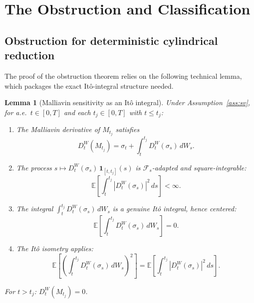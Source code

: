 \documentclass[11pt,a4paper]{article}
\theoremstyle{plain}
\newtheorem{lemma}[theorem]{Lemma}
\theoremstyle{definition}
\theoremstyle{remark}
\newcommand{\E}{\mathbb{E}}
\begin{document}
\section{The Obstruction and Classification}\label{sec:obstr}


\subsection{Obstruction for deterministic cylindrical reduction}

The proof of the obstruction theorem relies on the following technical lemma, which packages the exact Itô-integral structure needed.

\begin{lemma}[Malliavin sensitivity as an It\^o integral]\label{lem:mall_ito}
Under Assumption~\ref{ass:sv}, for a.e.\ $t \in [0,T]$ and each $t_j \in [0,T]$ with $t \le t_j$:
\begin{enumerate}[label=\textup{(\alph*)}]
\item The Malliavin derivative of $M_{t_j}$ satisfies
\begin{equation}\label{eq:mall_ito}
D_t^W(M_{t_j}) = \sigma_t + \int_t^{t_j} D_t^W(\sigma_s)\,dW_s.
\end{equation}
\item The process $s \mapsto D_t^W(\sigma_s)\,\mathbf{1}_{[t,t_j]}(s)$ is $\mathcal{F}_s$-adapted and square-integrable:
\[
\E\!\left[\int_t^{t_j} |D_t^W(\sigma_s)|^2\,ds\right] < \infty.
\]
\item The integral $\int_t^{t_j} D_t^W(\sigma_s)\,dW_s$ is a genuine It\^o integral, hence centered:
\[
\E\!\left[\int_t^{t_j} D_t^W(\sigma_s)\,dW_s\right] = 0.
\]
\item The It\^o isometry applies:
\[
\E\!\left[\left(\int_t^{t_j} D_t^W(\sigma_s)\,dW_s\right)^{\!2}\right] = \E\!\left[\int_t^{t_j} |D_t^W(\sigma_s)|^2\,ds\right].
\]
\end{enumerate}
For $t > t_j$: $D_t^W(M_{t_j}) = 0$.
\end{lemma}
\end{document}
